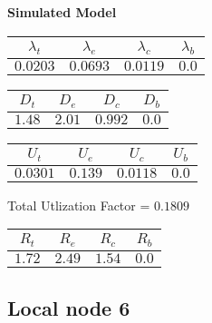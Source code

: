 \documentclass{article}
\begin{document}
\begin{minipage}{0.5\textwidth}
\centering	\textbf{Simulated Model}
\begin{table}[H]
\centering
\begin{tabular}{@{}cccc@{}}
\toprule
$\lambda_t$ & $\lambda_e$ & $\lambda_c$ & $\lambda_b$\\
\midrule
$0.0203$ & $0.0693$ & $0.0119$ & $0.0$\\
\bottomrule
\end{tabular}
\end{table}
\begin{table}[H]
\centering
\begin{tabular}{@{}cccc@{}}
\toprule
$D_t$ & $D_e$ & $D_c$ & $D_b$\\
\midrule
$1.48$ & $2.01$ & $0.992$ & $0.0$\\
\bottomrule
\end{tabular}
\end{table}\begin{table}[H]
\centering
\begin{tabular}{@{}cccc@{}}
\toprule
$U_t$ & $U_e$ & $U_c$ & $U_b$\\
\midrule
$0.0301$ & $0.139$ & $0.0118$ & $0.0$\\
\bottomrule
\end{tabular}
\end{table}
\centering Total Utlization Factor = $0.1809$
\begin{table}[H]
\centering
\begin{tabular}{@{}cccc@{}}
\toprule
$R_t$ & $R_e$ & $R_c$ & $R_b$\\
\midrule
$1.72$ & $2.49$ & $1.54$ & $0.0$\\
\bottomrule
\end{tabular}
\end{table}
\end{minipage}\subsection{Local node 6}
\end{document}
